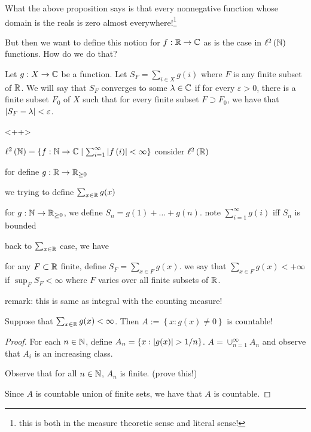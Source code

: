  What the above proposition says is that every nonnegative function whose domain is the reals is zero almost everywhere!\footnote{this is both in the measure theoretic sense and literal sense!}

 But then we want to define this notion for $f : \mathbb R \to \mathbb C$ as is the case in $\ell ^{2} \left( \mathbb N \right)$ functions. How do we do that?

 \begin{definition}
     Let $g: X \to \mathbb C$ be a function. Let $S_{F} = \sum_{i\in X} g(i)$ where $F$ is any finite subset of $\mathbb R$. We will say that $S_{F}$ converges to some $\lambda \in \mathbb C$ if for every $\varepsilon > 0$, there is a finite subset $F_{0}$ of $X$ such that for every finite subset $F \supset F_{0}$, we have that $\left\lvert S_{F} - \lambda  \right\rvert < \varepsilon$.
     \label{<+label+>}
 \end{definition}<++>

\horz



$\ell ^{2} \left( \mathbb N \right)  = \left\{ f : \mathbb N \to \mathbb C \mid \sum_{i=1}^{\infty} \left\lvert f \left( i \right) \right\rvert < \infty \right\}$
consider $\ell ^{2} \left( \mathbb R \right)$


for define $g : \mathbb R \to\mathbb R _{\ge 0}$

we trying to define $\sum_{x\in \mathbb R} g(x)$

for $g: \mathbb N \to \mathbb R _{\ge 0}$, we define $S_{n} = g(1) + \ldots + g(n)$. note $\sum_{i=1}^{\infty} g(i) $ iff $S_{n}$ is bounded

back to $\sum_{x\in \mathbb R}$ case, we have

for any $F \subset \mathbb R$ finite, define $S_{F} = \sum_{x\in F} g(x)$. we say that $\sum_{x\in F} g(x) < +\infty$ if $\sup_{F} S_{F} < \infty$ where $F$ varies over all finite subsets of $\mathbb R$. 

remark: this is same as integral with the counting measure!

\begin{proposition}
 Suppose that $\sum_{x\in \mathbb R} g(x) < \infty$. Then $A:=\left\{ x : g(x)\ne 0 \right\}$ is countable!
 \end{proposition}

 \begin{proof}
     For each $n\in \mathbb N$, define $A_{n} = \left\{ x : \left\lvert g(x) \right\rvert >1/n \right\}$.
     $A=\cup_{n=1}^{\infty} A_{n}$ and observe that $A_{i}$ is an increasing class.

     Observe that for all $n\in \mathbb N$, $A_{n}$ is finite. (prove this!) 

     Since $A$ is countable union of finite sets, we have that $A$ is countable.
 \end{proof}

